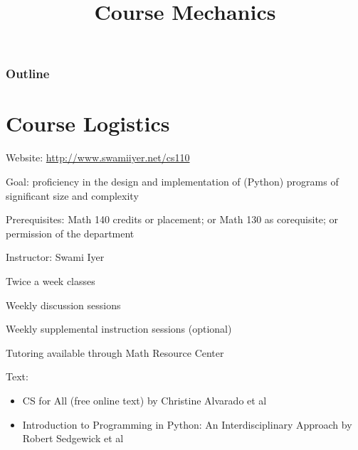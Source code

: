 \documentclass[8pt,a4paper,compress,handout]{beamer}
\title{Course Mechanics}
\date{}
\begin{document}
\begin{frame}
\vfill
\titlepage
\end{frame}

\begin{frame}
\frametitle{Outline}
\tableofcontents
\end{frame}

\section{Course Logistics}
\begin{frame}[fragile]
\pause
Website: \href{http://www.swamiiyer.net/cs110}{http://www.swamiiyer.net/cs110}

\pause
\bigskip

Goal: proficiency in the design and implementation of (Python) programs of significant size and complexity

\pause
\bigskip

Prerequisites: Math 140 credits or placement; or Math 130 as corequisite; or permission of the department

\pause
\bigskip

Instructor: Swami Iyer

\pause
\bigskip

Twice a week classes

\pause
\bigskip
Weekly discussion sessions

\pause
\bigskip

Weekly supplemental instruction sessions (optional)

\pause
\bigskip

Tutoring available through Math Resource Center

\pause
\bigskip

Text: 
\begin{itemize}
\item CS for All (free online text) by Christine Alvarado et al
\item Introduction to Programming in Python: An Interdisciplinary Approach by Robert Sedgewick et al
\end{itemize}
\end{frame}
\end{document}
